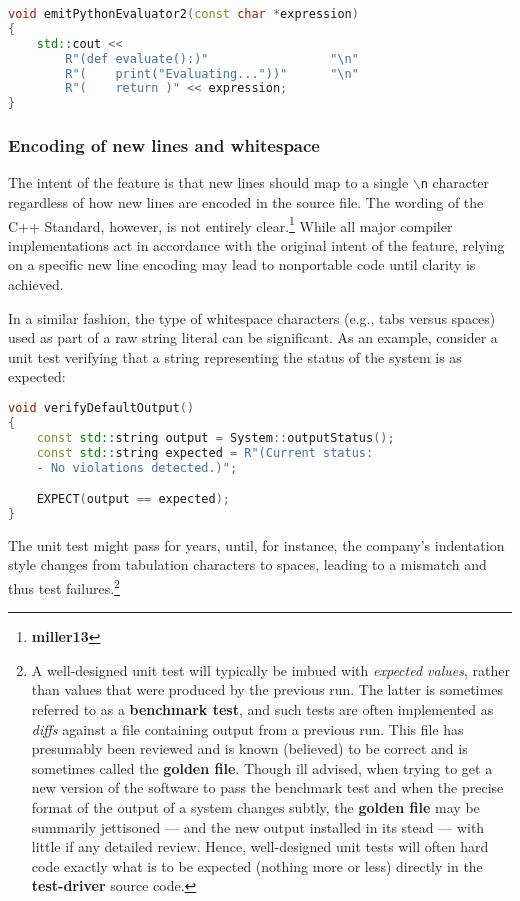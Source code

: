 \begin{lstlisting}[language=C++]
void emitPythonEvaluator2(const char *expression)
{
    std::cout <<
        R"(def evaluate():)"                 "\n"
        R"(    print("Evaluating..."))"      "\n"
        R"(    return )" << expression;
}
\end{lstlisting}


\subsubsection[Encoding of new lines and whitespace]{Encoding of new lines and whitespace}\label{encoding-of-newlines-and-whitespace}

The intent of the feature is that new lines should map to a single
\texttt{$\backslash$n} character regardless of how new lines are encoded
in the source file. The wording of the C++ Standard, however, is not
entirely clear.\footnote{\textbf{miller13}} While all major compiler
implementations act in accordance with the original intent of the
feature, relying on a specific new line encoding may lead to nonportable
code until clarity is achieved.

In a similar fashion, the type of whitespace characters (e.g., tabs
versus spaces) used as part of a raw string literal can be significant.
As an example, consider a unit test verifying that a string representing
the status of the system is as expected:

\begin{lstlisting}[language=C++]
void verifyDefaultOutput()
{
    const std::string output = System::outputStatus();
    const std::string expected = R"(Current status:
    - No violations detected.)";

    EXPECT(output == expected);
}
\end{lstlisting}

\noindent The unit test might pass for years, until, for instance, the
company's indentation style changes from tabulation characters to
spaces, leading to a mismatch and thus test failures.{\cprotect\footnote{A
well-designed unit test will typically be imbued with \emph{expected
values}, rather than values that were produced by the previous run.
The latter is sometimes referred to as a \textbf{benchmark test}, and such tests are often implemented as \emph{diffs} against
a file containing output from a previous run. This file has
presumably been reviewed and is known (believed) to be correct and is sometimes called the \textbf{golden file}. Though ill advised, when trying to get a new version of the software to pass the benchmark test and when the precise format of the output of a system
changes subtly, the \textbf{golden file} may be summarily jettisoned --- and the new
output installed in its stead --- with little if any detailed review.
Hence, well-designed unit tests will often hard code exactly what is
to be expected (nothing more or less) directly in the
  \textbf{test-driver} source code.}}

